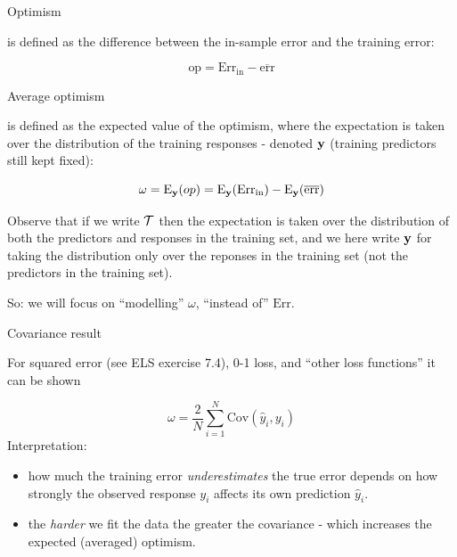 \documentclass[
  ignorenonframetext,
]{beamer}
\providecommand{\tightlist}{%
  \setlength{\itemsep}{0pt}\setlength{\parskip}{0pt}}
\begin{document}
\begin{frame}

\begin{block}{Optimism}

is defined as the difference between the in-sample error and the
training error:

\[ \text{op}=\text{Err}_{\text{in}}-\overline{\text{err}}\]

\end{block}

\begin{block}{Average optimism}

is defined as the expected value of the optimism, where the expectation
is taken over the distribution of the training responses - denoted
\({\bf y}\) (training predictors still kept fixed):

\[ \omega=\text{E}_{\bf y}(op)=\text{E}_{\bf y}(\text{Err}_{\text{in}})-\text{E}_{\bf y}(\overline{\text{err}})\]

Observe that if we write \({\cal T}\) then the expectation is taken over
the distribution of both the predictors and responses in the training
set, and we here write \({\bf y}\) for taking the distribution only over
the reponses in the training set (not the predictors in the training
set).

So: we will focus on ``modelling'' \(\omega\), ``instead of''
\(\text{Err}\).

\end{block}

\end{frame}

\begin{frame}

\begin{block}{Covariance result}

For squared error (see ELS exercise 7.4), 0-1 loss, and ``other loss
functions'' it can be shown

\[ \omega=\frac{2}{N} \sum_{i=1}^N \text{Cov}(\hat{y}_i,y_i)\]
Interpretation:

\begin{itemize}
\tightlist
\item
  how much the training error \emph{underestimates} the true error
  depends on how strongly the observed response \(y_i\) affects its own
  prediction \(\hat{y}_i\).
\item
  the \emph{harder} we fit the data the greater the covariance - which
  increases the expected (averaged) optimism.
\end{itemize}

\end{block}

\end{frame}
\end{document}
